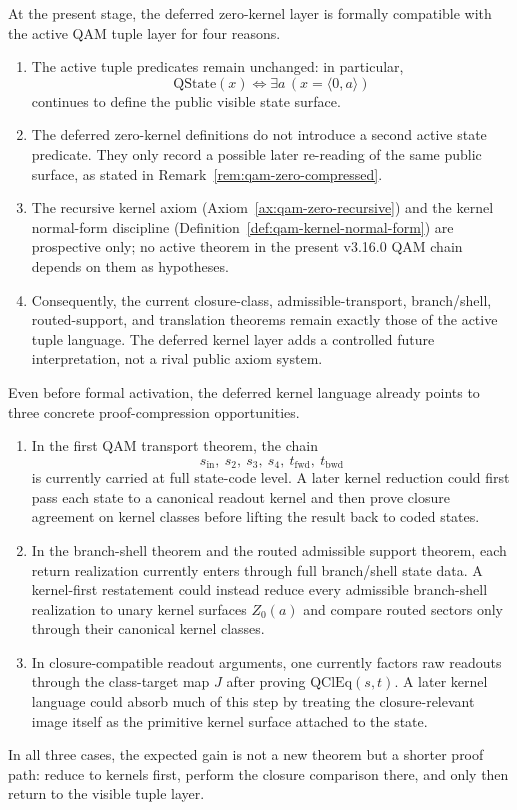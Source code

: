 \begin{remark}\label{rem:qam-zero-axiom-audit}
At the present stage, the deferred zero-kernel layer is formally compatible with the active QAM tuple layer for four reasons.
\begin{enumerate}
\item The active tuple predicates remain unchanged: in particular,
\[
\mathrm{QState}(x)\Longleftrightarrow \exists a\,(x=\langle 0,a\rangle)
\]
continues to define the public visible state surface.
\item The deferred zero-kernel definitions do not introduce a second active state predicate. They only record a possible later re-reading of the same public surface, as stated in Remark~\ref{rem:qam-zero-compressed}.
\item The recursive kernel axiom (Axiom~\ref{ax:qam-zero-recursive}) and the kernel normal-form discipline (Definition~\ref{def:qam-kernel-normal-form}) are prospective only; no active theorem in the present v3.16.0 QAM chain depends on them as hypotheses.
\item Consequently, the current closure-class, admissible-transport, branch/shell, routed-support, and translation theorems remain exactly those of the active tuple language. The deferred kernel layer adds a controlled future interpretation, not a rival public axiom system.
\end{enumerate}
\end{remark}

\begin{remark}\label{rem:qam-zero-proof-opportunities}
Even before formal activation, the deferred kernel language already points to three concrete proof-compression opportunities.
\begin{enumerate}
\item In the first QAM transport theorem, the chain
\[
s_{\mathrm{in}},\ s_2,\ s_3,\ s_4,\ t_{\mathrm{fwd}},\ t_{\mathrm{bwd}}
\]
is currently carried at full state-code level. A later kernel reduction could first pass each state to a canonical readout kernel and then prove closure agreement on kernel classes before lifting the result back to coded states.
\item In the branch-shell theorem and the routed admissible support theorem, each return realization currently enters through full branch/shell state data. A kernel-first restatement could instead reduce every admissible branch-shell realization to unary kernel surfaces $Z_0(a)$ and compare routed sectors only through their canonical kernel classes.
\item In closure-compatible readout arguments, one currently factors raw readouts through the class-target map $J$ after proving $\mathrm{QClEq}(s,t)$. A later kernel language could absorb much of this step by treating the closure-relevant image itself as the primitive kernel surface attached to the state.
\end{enumerate}
In all three cases, the expected gain is not a new theorem but a shorter proof path: reduce to kernels first, perform the closure comparison there, and only then return to the visible tuple layer.
\end{remark}

